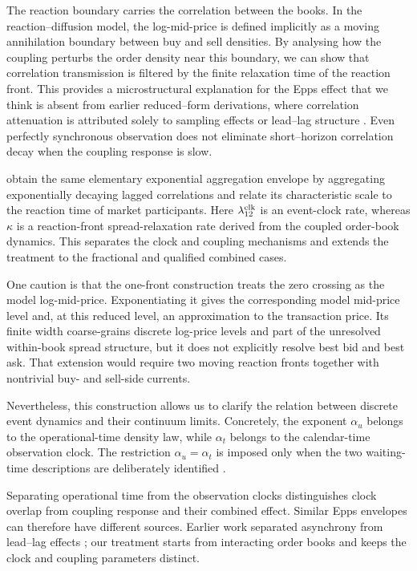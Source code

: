\documentclass[5p,final]{elsarticle}
\begin{document}
The reaction boundary carries the correlation between the books. In the reaction--diffusion model, the log-mid-price is defined implicitly as a moving annihilation boundary between buy and sell densities. By analysing how the coupling perturbs the order density near this boundary, we can show that correlation transmission is filtered by the finite relaxation time of the reaction front. This provides a microstructural explanation for the Epps effect that we think is absent from earlier reduced--form derivations, where correlation attenuation is attributed solely to sampling effects or lead--lag structure \citep{toth2009,chang2021}.
Even perfectly synchronous observation does not eliminate short--horizon correlation decay when the coupling response is slow. 

\citet{toth2009} obtain the same elementary exponential aggregation envelope by aggregating exponentially decaying lagged correlations and relate its characteristic scale to the reaction time of market participants. Here $\lambda_{12}^{\rm clk}$ is an event-clock rate, whereas $\kappa$ is a reaction-front spread-relaxation rate derived from the coupled order-book dynamics. This separates the clock and coupling mechanisms and extends the treatment to the fractional and qualified combined cases.

One caution is that the one-front construction treats the zero crossing as the model log-mid-price. Exponentiating it gives the corresponding model mid-price level and, at this reduced level, an approximation to the transaction price. Its finite width coarse-grains discrete log-price levels and part of the unresolved within-book spread structure, but it does not explicitly resolve best bid and best ask. That extension would require two moving reaction fronts together with nontrivial buy- and sell-side currents. 

Nevertheless, this construction allows us to clarify the relation between discrete event dynamics and their continuum limits. Concretely, the exponent $\alpha_u$ belongs to the operational-time density law, while $\alpha_t$ belongs to the calendar-time observation clock. The restriction $\alpha_u=\alpha_t$ is imposed only when the two waiting-time descriptions are deliberately identified \citep{montroll1965,scalas2006,angstmann2016}.

Separating operational time from the observation clocks distinguishes clock overlap from coupling response and their combined effect. Similar Epps envelopes can therefore have different sources. Earlier work separated asynchrony from lead--lag effects \citep{mastromatteo2011}; our treatment starts from interacting order books and keeps the clock and coupling parameters distinct.
\end{document}
